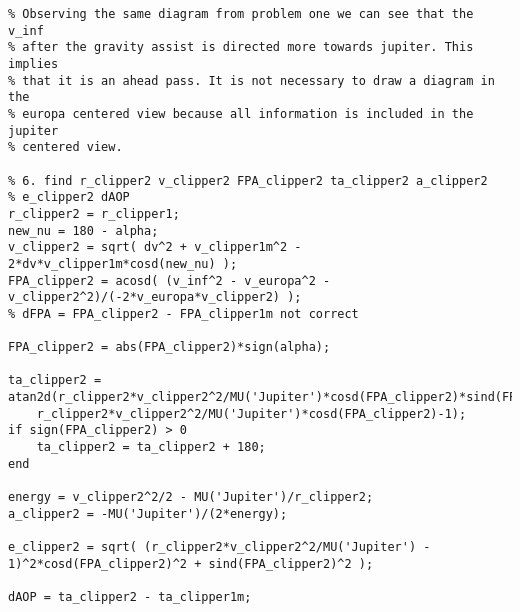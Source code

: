 \begin{lstlisting}[frame=lines,style=Matlab-editor,basicstyle = \mlttfamily]
% 5. Ahead or behind
% Observing the same diagram from problem one we can see that the v_inf
% after the gravity assist is directed more towards jupiter. This implies
% that it is an ahead pass. It is not necessary to draw a diagram in the
% europa centered view because all information is included in the jupiter
% centered view.

% 6. find r_clipper2 v_clipper2 FPA_clipper2 ta_clipper2 a_clipper2
% e_clipper2 dAOP
r_clipper2 = r_clipper1;
new_nu = 180 - alpha;
v_clipper2 = sqrt( dv^2 + v_clipper1m^2 - 2*dv*v_clipper1m*cosd(new_nu) );
FPA_clipper2 = acosd( (v_inf^2 - v_europa^2 - v_clipper2^2)/(-2*v_europa*v_clipper2) );
% dFPA = FPA_clipper2 - FPA_clipper1m not correct

FPA_clipper2 = abs(FPA_clipper2)*sign(alpha);

ta_clipper2 = atan2d(r_clipper2*v_clipper2^2/MU('Jupiter')*cosd(FPA_clipper2)*sind(FPA_clipper2),...
    r_clipper2*v_clipper2^2/MU('Jupiter')*cosd(FPA_clipper2)-1);
if sign(FPA_clipper2) > 0
    ta_clipper2 = ta_clipper2 + 180;
end

energy = v_clipper2^2/2 - MU('Jupiter')/r_clipper2;
a_clipper2 = -MU('Jupiter')/(2*energy);

e_clipper2 = sqrt( (r_clipper2*v_clipper2^2/MU('Jupiter') - 1)^2*cosd(FPA_clipper2)^2 + sind(FPA_clipper2)^2 );

dAOP = ta_clipper2 - ta_clipper1m;


\end{lstlisting}

